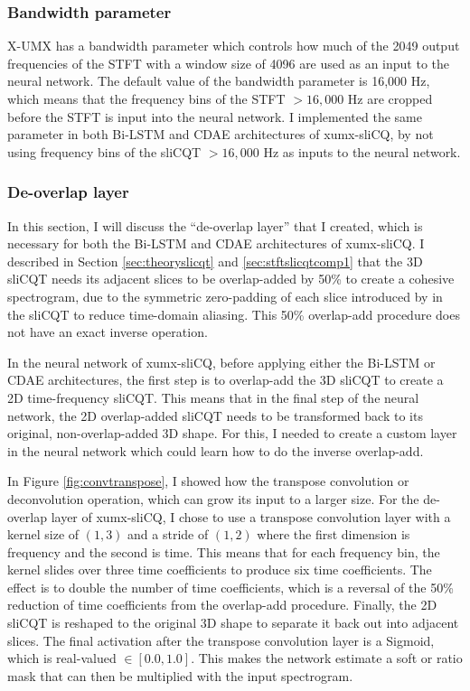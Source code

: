 \documentclass[report.tex]{subfiles}
\begin{document}
\subsubsection{Bandwidth parameter}
\label{sec:bandwidth}

X-UMX has a bandwidth parameter which controls how much of the 2049 output frequencies of the STFT with a window size of 4096 are used as an input to the neural network. The default value of the bandwidth parameter is 16,000 Hz, which means that the frequency bins of the STFT $> 16,000 \text{ Hz}$ are cropped before the STFT is input into the neural network. I implemented the same parameter in both Bi-LSTM and CDAE architectures of xumx-sliCQ, by not using frequency bins of the sliCQT $> 16,000 \text{ Hz}$ as inputs to the neural network.

\subsubsection{De-overlap layer}
\label{sec:deoverlap}

In this section, I will discuss the ``de-overlap layer'' that I created, which is necessary for both the Bi-LSTM and CDAE architectures of xumx-sliCQ. I described in Section \ref{sec:theoryslicqt} and \ref{sec:stftslicqtcomp1} that the 3D sliCQT needs its adjacent slices to be overlap-added by 50\% to create a cohesive spectrogram, due to the symmetric zero-padding of each slice introduced by \textcite{slicq} in the sliCQT to reduce time-domain aliasing. This 50\% overlap-add procedure does not have an exact inverse operation.

In the neural network of xumx-sliCQ, before applying either the Bi-LSTM or CDAE architectures, the first step is to overlap-add the 3D sliCQT to create a 2D time-frequency sliCQT. This means that in the final step of the neural network, the 2D overlap-added sliCQT needs to be transformed back to its original, non-overlap-added 3D shape. For this, I needed to create a custom layer in the neural network which could learn how to do the inverse overlap-add.

In Figure \ref{fig:convtranspose}, I showed how the transpose convolution or deconvolution operation, which can grow its input to a larger size. For the de-overlap layer of xumx-sliCQ, I chose to use a transpose convolution layer with a kernel size of $(1, 3)$ and a stride of $(1, 2)$ where the first dimension is frequency and the second is time. This means that for each frequency bin, the kernel slides over three time coefficients to produce six time coefficients. The effect is to double the number of time coefficients, which is a reversal of the 50\% reduction of time coefficients from the overlap-add procedure. Finally, the 2D sliCQT is reshaped to the original 3D shape to separate it back out into adjacent slices. The final activation after the transpose convolution layer is a Sigmoid, which is real-valued $\in [0.0, 1.0]$. This makes the network estimate a soft or ratio mask that can then be multiplied with the input spectrogram.
\end{document}
